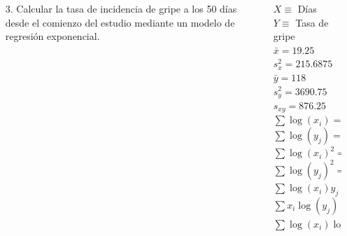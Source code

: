 \documentclass[aspectratio=149,10pt,t]{beamer}
\begin{document}
\begin{frame}
	\begin{columns}
		\begin{column}[T]{0.64\textwidth}
			\begin{enumerate}
				\item[3.] Calcular la tasa de incidencia de gripe a los 50 días desde el comienzo del estudio mediante un modelo de regresión exponencial.
			\end{enumerate}
		\end{column}
		\begin{column}[T]{0.36\textwidth}
			\begin{datos}
				$X\equiv$ Días\\
				$Y\equiv$ Tasa de gripe\\
				$\bar x=19.25$\\ 
				$s_x^2=215.6875$\\ 
				$\bar y=118$\\
				$s_y^2=3690.75$\\
				$s_{xy}=876.25$\\ 
				$\sum \log(x_i)=19.8494$\\ 
				$\sum \log(y_j)=37.2024$\\
				$\sum \log(x_i)^2=60.2309$\\
				$\sum \log(y_j)^2=174.8363$\\
				$\sum \log(x_i)y_j=2795.2484$\\
				$\sum x_i\log(y_j)=772.3504$\\
				$\sum \log(x_i)\log(y_j)=96.1974$
			\end{datos}
		\end{column}
	\end{columns}
\end{frame}
\end{document}
